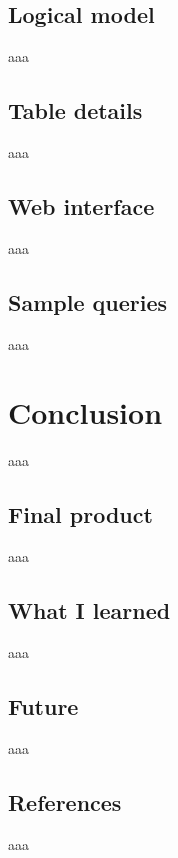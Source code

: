 \documentclass[12pt]{report}
\begin{document}
        \chapter{Logical model}
            aaa

        \chapter{Table details}
            aaa

        \chapter{Web interface}
            aaa

        \chapter{Sample queries}
            aaa

    \part{Conclusion}
        aaa

        \chapter{Final product}
            aaa

        \chapter{What I learned}
            aaa

        \chapter{Future}
            aaa

        \chapter{References}
            aaa
\end{document}
